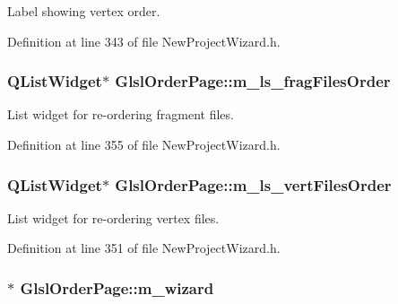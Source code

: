 Label showing vertex order. 



Definition at line 343 of file New\-Project\-Wizard.\-h.

\subsubsection[{m\-\_\-ls\-\_\-frag\-Files\-Order}]{\setlength{\rightskip}{0pt plus 5cm}Q\-List\-Widget$\ast$ Glsl\-Order\-Page\-::m\-\_\-ls\-\_\-frag\-Files\-Order\hspace{0.3cm}{\ttfamily [private]}}\label{class_glsl_order_page_a57a4a088cdc8f8512df8a5a31dffea9c}


List widget for re-\/ordering fragment files. 



Definition at line 355 of file New\-Project\-Wizard.\-h.

\subsubsection[{m\-\_\-ls\-\_\-vert\-Files\-Order}]{\setlength{\rightskip}{0pt plus 5cm}Q\-List\-Widget$\ast$ Glsl\-Order\-Page\-::m\-\_\-ls\-\_\-vert\-Files\-Order\hspace{0.3cm}{\ttfamily [private]}}\label{class_glsl_order_page_ace890b99329ea9f92a207cf5302049e8}


List widget for re-\/ordering vertex files. 



Definition at line 351 of file New\-Project\-Wizard.\-h.

\subsubsection[{m\-\_\-wizard}]{$\ast$ Glsl\-Order\-Page\-::m\-\_\-wizard\hspace{0.3cm}{\ttfamily [private]}}\label{class_glsl_order_page_a9ed4eea5777a1130a8ba899ac2a2a368}


